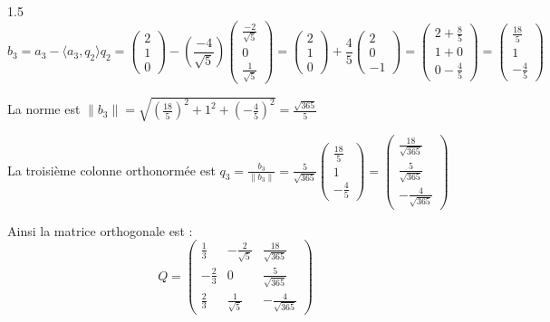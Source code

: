 \documentclass[12pt]{article}
\begin{document}
\begin{spacing}{1.5}
\[b_3=a_3-\langle a_3,q_2\rangle q_2=\begin{pmatrix}
2\\
1\\
0
\end{pmatrix}-\left(\frac{-4}{\sqrt{5}}\right)\begin{pmatrix}
\frac{-2}{\sqrt{5}}\\
0\\
\frac{1}{\sqrt{5}}
\end{pmatrix}=\begin{pmatrix}
2\\
1\\
0
\end{pmatrix}+\frac{4}{5}\begin{pmatrix}
2\\
0\\
-1
\end{pmatrix}=\begin{pmatrix}
2+\frac{8}{5}\\
1+0\\
0-\frac{4}{5}
\end{pmatrix}=\begin{pmatrix}
\frac{18}{5}\\
1\\
-\frac{4}{5}
\end{pmatrix}\]

La norme est $\parallel b_3\parallel =\sqrt{\left(\frac{18}{5}\right)^2+1^2+\left(-\frac{4}{5}\right)^2}=\frac{\sqrt{365}}{5}$

La troisième colonne orthonormée est $q_3=\frac{b_3}{\parallel b_3\parallel}=\frac{5}{\sqrt{365}}\begin{pmatrix}
\frac{18}{5}\\
1\\
-\frac{4}{5}
\end{pmatrix}=\begin{pmatrix}
\frac{18}{\sqrt{365}}\\
\frac{5}{\sqrt{365}}\\
-\frac{4}{\sqrt{365}}
\end{pmatrix}$

Ainsi la matrice orthogonale est : \[Q=\begin{pmatrix}
\frac{1}{3} & -\frac{2}{\sqrt{5}}& \frac{18}{\sqrt{365}} \\ 
-\frac{2}{3}& 0                 &  \frac{5}{\sqrt{365}} \\ 
\frac{2}{3} & \frac{1}{\sqrt{5}} & -\frac{4}{\sqrt{365}}
\end{pmatrix} \]


\end{spacing}
\end{document}
